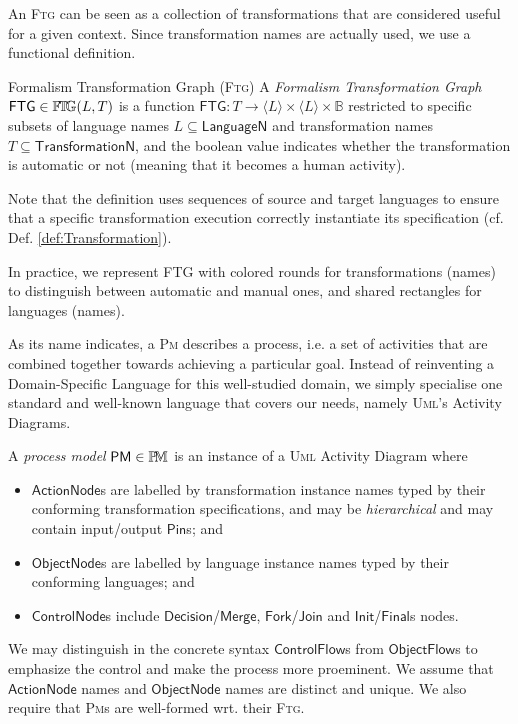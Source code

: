 An \textsc{Ftg} can be seen as a collection of transformations that are 
considered useful for a given context. Since transformation names are actually 
used, we use a functional definition.
\begin{Definition}{Formalism Transformation Graph (\textsc{Ftg})}
   A \emph{Formalism Transformation Graph} $\mathsf{FTG} \in \mathbb{F}\!\mathbb{T}\!\mathbb{G}(L, T)$ is a 
function  $\mathsf{FTG} \colon T \to \langle L \rangle \times \langle L \rangle 
\times \mathbb{B}$ restricted to specific subsets of language names $L 
\subseteq \mathsf{LanguageN}$ and transformation names $T\subseteq 
\mathsf{TransformationN}$, and the boolean value indicates whether the 
transformation is automatic or not (meaning that it becomes a human activity).
\end{Definition}
Note that the definition uses sequences of source and target languages to 
ensure that a specific transformation execution correctly instantiate its 
specification (cf. Def. \ref{def:Transformation}).

In practice, we represent \textsf{FTG} with colored rounds for transformations 
(names) to distinguish between automatic and manual ones, and shared rectangles 
for languages (names).

\medskip
As its name indicates, a \textsc{Pm} describes a process, i.e. a set of 
activities that are combined together towards achieving a particular goal. 
Instead of reinventing a Domain-Specific Language for this well-studied domain, 
we simply specialise one standard and well-known language that covers our 
needs, namely \textsc{Uml}'s Activity Diagrams.


\begin{Definition}
   A \emph{process model} $\mathsf{PM}\in\mathbb{P}\!\mathbb{M}$ is an instance of a 
\textsc{Uml} Activity Diagram where 
\begin{itemize}
   \item $\mathsf{ActionNode}$s are labelled by transformation instance names 
typed by their conforming transformation specifications, and may be 
\emph{hierarchical} and may contain input/output $\mathsf{Pin}$s; and 
   \item $\mathsf{ObjectNode}$s are labelled by language instance names typed 
by their conforming languages; and 
   \item $\mathsf{ControlNode}$s include 
$\mathsf{Decision}$/$\mathsf{Merge}$, $\mathsf{Fork}$/$\mathsf{Join}$ and 
$\mathsf{Init}$/$\mathsf{Final}$s nodes.   
\end{itemize}
\end{Definition}
We may distinguish in the concrete syntax $\mathsf{ControlFlow}$s from 
$\mathsf{ObjectFlow}$s to emphasize the control and make the process more 
proeminent. We assume that $\mathsf{ActionNode}$ names and 
$\mathsf{ObjectNode}$ names are distinct and unique. We also require that 
\textsc{Pm}s are well-formed wrt. their \textsc{Ftg}.

